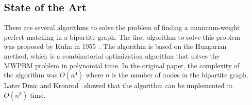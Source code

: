 \begin{comment}
In general, even if all the coefficients of the constraint matrix in a linear program are either 0 or 1, the extreme points of a linear program are not guaranteed to all have integral coordinates. This is not surprising since the general integer programming problem is NP-hard, while linear programming is solvable in polynomial time. Consequently, there is no guarantee that the value $Z_{IP}$ of an integer program is equal to the value $Z_{LP}$ of its LP relaxation. However, since the integer program is more constrained than the relaxation, we always have $Z_{IP} \geq Z_{LP}$, implying that $Z_{LP}$ is a lower bound on $Z_{IP}$ for a minimization problem. Moreover, if an optimal solution to a linear programming relaxation is integral, then it must also be an optimal solution to the integer program.

In our problem, the constraint matrix has a special form that leads to the following result: 

\begin{theorem}
    Any extreme point of $P$ is a $0-1$ vector; hence, it is the incidence vector of a perfect matching.
\end{theorem}

Consequently, the polytope

\begin{equation}
    \begin{aligned}
        \{ x: & \sum_{j \in V_2} x_{ij} = 1, \quad \forall i \in V_1, \\
        & \sum_{i \in V_1} x_{ij} = 1, \quad \forall j \in V_2, \\
        & 0 \leq x_{ij} \leq 1, \quad \forall (i, j) \in E \}
    \end{aligned}
\end{equation}

is called the bipartite perfect matching polytope (see Lecture notes by \cite{goemans2009matching}). 
\end{comment}

\subsection{State of the Art} \label{sec:mwpbm_solutions}
There are several algorithms to solve the problem of finding a minimum-weight perfect matching in a bipartite graph. The first algorithm to solve this problem was proposed by Kuhn in 1955~\cite{kuhn1955hungarian}. The algorithm is based on the Hungarian method, which is a combinatorial optimization algorithm that solves the MWPBM problem in polynomial time. In the original paper, the complexity of the algorithm was $O(n^4)$ where $n$ is the number of nodes in the bipartite graph. Later Dinic and Kronrod~\cite{dinic1969algorithm} showed that the algorithm can be implemented in $O(n^3)$ time.

